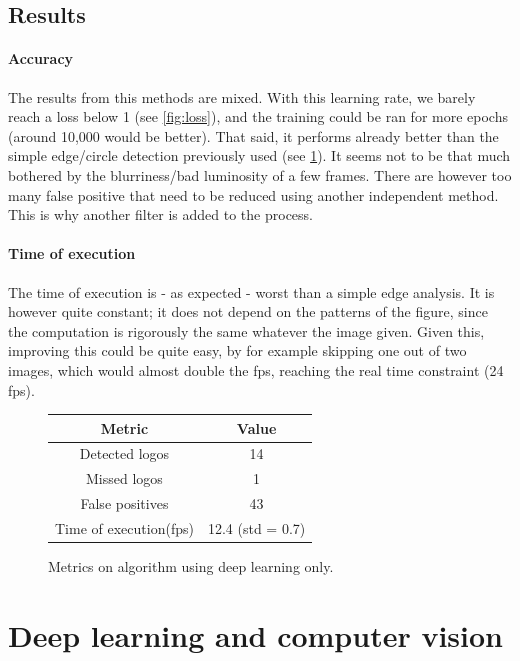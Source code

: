 \documentclass[12pt]{article}%
\begin{document}
\subsection{Results}

\paragraph{Accuracy}
The results from this methods are mixed. With this learning rate, we barely reach a loss below 1 (see \ref{fig:loss}), and the training could be ran for more epochs (around 10,000 would be better). That said, it performs already better than the simple edge/circle detection previously used (see \ref{fig:deepLearningResults}). It seems not to be that much bothered by the blurriness/bad luminosity of a few frames. There are however too many false positive that need to be reduced using another independent method. This is why another filter is added to the process.

\paragraph{Time of execution}
The time of execution is - as expected - worst than a simple edge analysis. It is however quite constant; it does not depend on the patterns of the figure, since the computation is rigorously the same whatever the image given. Given this, improving this could be quite easy, by for example skipping one out of two images, which would almost double the fps, reaching the real time constraint (24 fps).

\begin{figure}
    \centering
        \begin{tabular}{c | c}
        Metric                  & Value \\
        \hline
        Detected logos          & 14 \\
        Missed logos            & 1 \\
        False positives         & 43 \\
        Time of execution(fps)  & 12.4 (std = 0.7) \\
        \end{tabular}
    \caption{Metrics on algorithm using deep learning only.}
    \label{fig:deepLearningResults}
\end{figure}

\section{Deep learning and computer vision}
\end{document}
